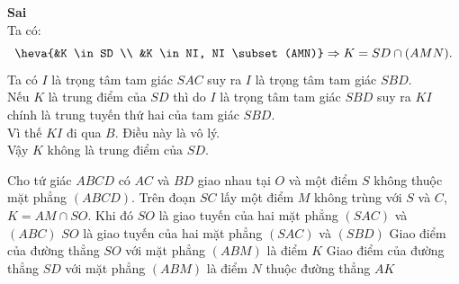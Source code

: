 \begin{ex}
{\begin{itemchoice}
			\itemch \textbf{Sai}  \\
			Ta có: 
			 \[
			 \heva{&K \in SD \\ &K \in NI, NI \subset (AMN)}
			\Rightarrow K = SD  \cap (AMN).
			 \]
			Ta có $I$  là trọng tâm tam giác $SAC$ suy ra $I$ là trọng tâm tam giác $SBD$.\\
			Nếu $K$ là trung điểm của $SD$ thì do $I$ là trọng tâm tam giác $SBD$ suy ra $KI$ chính là trung tuyến thứ hai của tam giác  $SBD$.\\
			Vì thế $KI$ đi qua $B$. Điều này là vô lý.\\ 
			 Vậy $K$ không là trung điểm của $SD$.
		\end{itemchoice}
	} 
\end{ex}

\begin{ex}%
	Cho  tứ giác $ABCD$ có $AC$ và $BD$ giao nhau tại $O$ và một điểm $S$ không thuộc mặt phẳng $(ABCD)$. Trên đoạn $SC$ lấy một điểm $M$ không trùng với $S$ và $C$, $K=AM\cap SO$. Khi đó
	\choiceTF 
		{$S O$ là giao tuyến  của hai mặt phẳng $(SAC)$ và $(ABC)$}
		{\True $SO$ là giao tuyến của  hai mặt phẳng $(SAC)$ và $(SBD)$}
		{\True Giao điểm của đường thẳng $SO$ với  mặt phẳng $(ABM)$ là điểm $K$}
		{Giao điểm của  đường thẳng $SD$ với mặt phẳng $(ABM)$ là điểm $N$ thuộc đường thẳng $AK$}
\end{ex}
